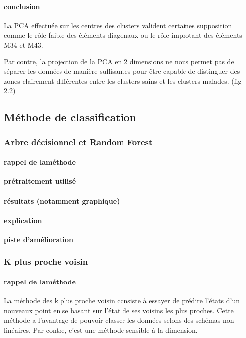 \documentclass[a4paper,10pt]{report}
\begin{document}
\paragraph{conclusion}
La PCA effectuée sur les centres des clusters valident certaines supposition comme le rôle faible des éléments diagonaux ou le rôle improtant des éléments M34 et M43.

Par contre, la projection de la PCA en 2 dimensions ne nous permet pas de séparer les données de manière suffisantes pour être capable de distinguer des zones clairement différentes entre les clusters sains et les clusters malades. (fig 2.2)
\subsection{Méthode de classification}

\subsubsection{Arbre décisionnel et Random Forest}
\paragraph{rappel de laméthode }
\paragraph{prétraitement utilisé}
\paragraph{résultats (notamment graphique)}
\paragraph{explication}
\paragraph{piste d'amélioration}

\subsubsection{K plus proche voisin}
\paragraph{rappel de laméthode }
La méthode des k plus proche voisin consiste à essayer de prédire l'états d'un nouveaux point en se basant sur l'état de ses voisins les plus proches. Cette méthode a l'avantage de pouvoir classer les données selons des schémas non linéaires. Par contre, c'est une méthode sensible à la dimension. 
\end{document}
